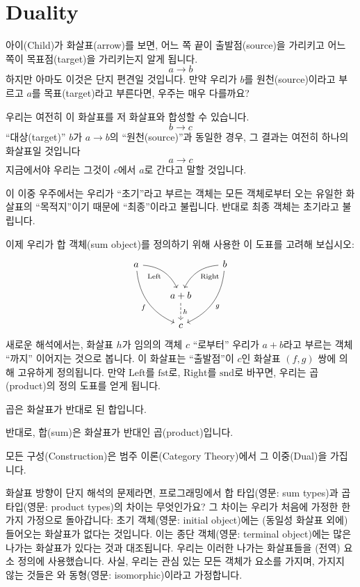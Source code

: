 \documentclass[DaoFP]{subfiles}
\begin{document}
\section{Duality}

아이(Child)가 화살표(arrow)를 보면, 어느 쪽 끝이 출발점(source)을 가리키고 어느 쪽이 목표점(target)을 가리키는지 알게 됩니다.
\[a \to b \]
하지만 아마도 이것은 단지 편견일 것입니다. 만약 우리가 $b$를 원천(source)이라고 부르고 $a$를 목표(target)라고 부른다면, 우주는 매우 다를까요?

우리는 여전히 이 화살표를 저 화살표와 합성할 수 있습니다.
\[b \to c\]
``대상(target)'' $b$가 $a \to b$의 ``원천(source)''과 동일한 경우, 그 결과는 여전히 하나의 화살표일 것입니다
\[a \to c\]
지금에서야 우리는 그것이 $c$에서 $a$로 간다고 말할 것입니다.

이 이중 우주에서는 우리가 ``초기''라고 부르는 객체는 모든 객체로부터 오는 유일한 화살표의 ``목적지''이기 때문에 ``최종''이라고 불립니다. 반대로 최종 객체는 초기라고 불립니다.

이제 우리가 합 객체(sum object)를 정의하기 위해 사용한 이 도표를 고려해 보십시오:
\[
 \begin{tikzcd}
 a
 \arrow[dr,  bend left, "\text{Left}"']
 \arrow[ddr, bend right, "f"']
 && b
 \arrow[dl, bend right, "\text{Right}"]
 \arrow[ddl, bend left, "g"]
 \\
&a + b
\arrow[d, dashed, "h"]
\\
& c
 \end{tikzcd}
\]
새로운 해석에서는, 화살표 $h$가 임의의 객체 $c$ ``로부터'' 우리가 $a + b$라고 부르는 객체 ``까지'' 이어지는 것으로 봅니다. 이 화살표는 ``출발점''이 $c$인 화살표 $(f, g)$ 쌍에 의해 고유하게 정의됩니다. 만약 $\text{Left}$를 $\text{fst}$로, $\text{Right}$를 $\text{snd}$로 바꾸면, 우리는 곱(product)의 정의 도표를 얻게 됩니다.

곱은 화살표가 반대로 된 합입니다.

반대로, 합(sum)은 화살표가 반대인 곱(product)입니다.

\medskip

모든 구성(Construction)은 범주 이론(Category Theory)에서 그 이중(Dual)을 가집니다.

\medskip

화살표 방향이 단지 해석의 문제라면, 프로그래밍에서 합 타입(영문: sum types)과 곱 타입(영문: product types)의 차이는 무엇인가요? 그 차이는 우리가 처음에 가정한 한 가지 가정으로 돌아갑니다: 초기 객체(영문: initial object)에는 (동일성 화살표 외에) 들어오는 화살표가 없다는 것입니다. 이는 종단 객체(영문: terminal object)에는 많은 나가는 화살표가 있다는 것과 대조됩니다. 우리는 이러한 나가는 화살표들을 (전역) 요소 정의에 사용했습니다. 사실, 우리는 관심 있는 모든 객체가 요소를 가지며, 가지지 않는 것들은 와 동형(영문: isomorphic)이라고 가정합니다.
\end{document}

